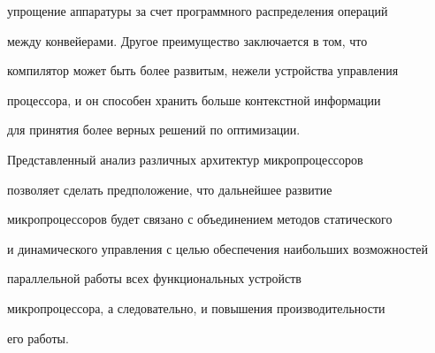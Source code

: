 упрощение аппаратуры за счет программного распределения операций 


между конвейерами. Другое преимущество заключается в том, что 


компилятор может быть более развитым, нежели устройства управ\-ле\-ния 


процессора, и он способен хранить больше контекстной информации 


для принятия более верных решений по оптимизации.


 


 Представленный анализ различных архитектур микропроцессоров 


позволяет сделать предположение, что дальнейшее развитие 


микропроцессоров будет связано с объединением методов статического 


и динамического управ\-ле\-ния с \mbox{целью} обеспечения наибольших возможностей 


параллельной работы всех функциональных устройств 


микропроцессора, а следовательно, и повышения производительности 


его работы.











